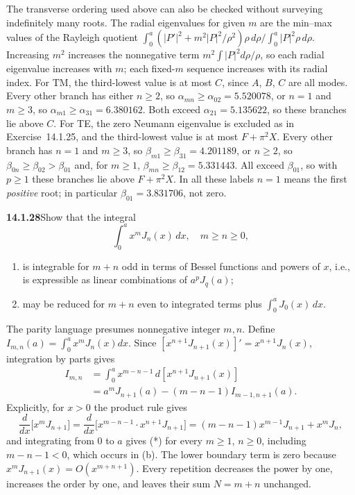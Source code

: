 The transverse ordering used above can also be checked without
surveying indefinitely many roots. The radial eigenvalues for given
$m$ are the min--max values of the Rayleigh quotient
$\int_0^a(|P'|^2+m^2|P|^2/\rho^2)\rho\,d\rho\big/\int_0^a|P|^2\rho\,d\rho$.
Increasing $m^2$ increases the nonnegative term
$m^2\int |P|^2d\rho/\rho$, so each radial eigenvalue increases with
$m$; each fixed-$m$ sequence increases with its radial index.
For TM, the third-lowest value is at most $C$, since $A$, $B$, $C$
are all modes. Every other branch has either $n\ge2$, so
$\alpha_{mn}\ge\alpha_{02}=5.520078$, or $n=1$ and $m\ge3$, so
$\alpha_{m1}\ge\alpha_{31}=6.380162$. Both exceed
$\alpha_{21}=5.135622$, so these branches lie above $C$.
For TE, the zero Neumann eigenvalue is excluded as in
Exercise~14.1.25, and the third-lowest value is at most $F+\pi^2X$.
Every other branch has $n=1$ and $m\ge3$, so
$\beta_{m1}\ge\beta_{31}=4.201189$, or $n\ge2$, so
$\beta_{0n}\ge\beta_{02}>\beta_{01}$ and, for $m\ge1$,
$\beta_{mn}\ge\beta_{12}=5.331443$. All exceed $\beta_{01}$, so with
$p\ge1$ these branches lie above $F+\pi^2X$. In all
these labels $n=1$ means the first \emph{positive} root; in
particular $\beta_{01}=3.831706$, not zero.

\par\bigskip
\noindent\textbf{14.1.28}\quad Show that the integral
\[
\int_{0}^{a}x^{m}J_{n}(x)\,dx,\quad m\ge n\ge0,
\]
\begin{enumerate}
\item[(a)] is integrable for $m+n$ odd in terms of Bessel functions and
powers of $x$, i.e., is expressible as linear combinations of
$a^{p}J_{q}(a)$;
\item[(b)] may be reduced for $m+n$ even to integrated terms plus
$\displaystyle\int_{0}^{a}J_{0}(x)\,dx$.
\end{enumerate}
\par{}
\solution
The parity language presumes nonnegative integer $m,n$. Define
$I_{m,n}(a)=\int_0^a x^mJ_n(x)dx$. Since
$[x^{n+1}J_{n+1}(x)]'=x^{n+1}J_n(x)$, integration by parts gives
\begin{align*}
I_{m,n}
&=\int_0^a x^{m-n-1}\,d[x^{n+1}J_{n+1}(x)]\\
&=a^mJ_{n+1}(a)-(m-n-1)I_{m-1,n+1}(a).
\tag{*}
\end{align*}
Explicitly, for $x>0$ the product rule gives
\[
\frac d{dx}\bigl[x^mJ_{n+1}\bigr]
=\frac d{dx}\bigl[x^{m-n-1}\cdot x^{n+1}J_{n+1}\bigr]
=(m-n-1)x^{m-1}J_{n+1}+x^mJ_n,
\]
and integrating from $0$ to $a$ gives (*) for every $m\ge1$, $n\ge0$,
including $m-n-1<0$, which occurs in (b).
The lower boundary term is zero because
$x^mJ_{n+1}(x)=O(x^{m+n+1})$. Every repetition decreases the
power by one, increases the order by one, and leaves their sum
$N=m+n$ unchanged.

